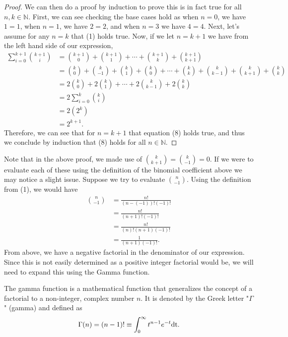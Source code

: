\begin{proof}
	We can then do a proof by induction to prove this is in fact true for all $n,k \in \mathbb{N}$. First, we can see checking the base cases hold as when $n=0$, we have $1=1$, when $n=1$, we have $2=2$, and when $n=3$ we have $4=4$. Next, let's assume for any $n=k$ that (1) holds true. Now, if we let $n=k+1$ we have from the left hand side of our expression,
	\begin{align}
		\sum_{i=0}^{k+1}{{k+1}\choose{i}}&={{k+1}\choose{0}}+{{k+1}\choose{1}}+\cdots+{{k+1}\choose{k}}+{{k+1}\choose{k+1}} \\
		&={{k}\choose{0}}+{{k}\choose{-1}}+{{k}\choose{1}}+{{k}\choose{0}}+\cdots+{{k}\choose{k}}+{{k}\choose{k-1}}+{{k}\choose{k+1}}+{{k}\choose{k}}\\
		&=2{{k}\choose{0}}+2{{k}\choose{1}}+\cdots+2{{k}\choose{k-1}}+2{{k}\choose{k}}\\
		&=2\sum_{i=0}^{k}{{k}\choose{i}}\\
		&=2(2^k)\\
		&=2^{k+1}.
	\end{align}
	Therefore, we can see that for $n=k+1$ that equation (8) holds true, and thus we conclude by induction that (8) holds for all $n\in\mathbb{N}$.
\end{proof} 

Note that in the above proof, we made use of ${{k}\choose{k+1}}={{k}\choose{-1}}=0$. If we were to evaluate each of these using the definition of the binomial coefficient above we may notice a slight issue. Suppose we try to evaluate ${{n}\choose{-1}}$. Using the definition from (1), we would have
\begin{align}
	{{n}\choose{-1}}&=\frac{n!}{(n-(-1))!(-1)!}\\&=\frac{n!}{(n+1)!(-1)!} \\
	&=\frac{n!}{(n)!(n+1)(-1)!} \\
	&=\frac{1}{(n+1)(-1)!}.
\end{align}
From above, we have a negative factorial in the denominator of our expression. Since this is not easily determined as a positive integer factorial would be, we will need to expand this using the Gamma function. 

\begin{defn}{1}
	The gamma function is a mathematical function that generalizes the concept of a factorial to a non-integer, complex number $n$. It is denoted by the Greek letter "$\Gamma$" (gamma) and defined as
	\begin{align}
		\Gamma(n)=(n-1)!\equiv\int_{0}^{\infty}t^{n-1}e^{-t}\textnormal{dt}.
	\end{align}
\end{defn}


